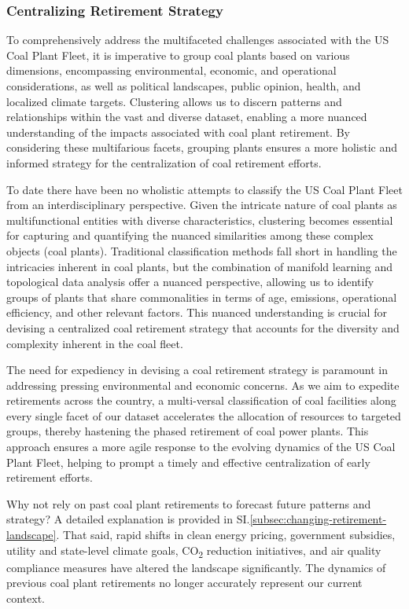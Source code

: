 \subsubsection*{Centralizing Retirement Strategy}


To comprehensively address the multifaceted challenges associated with the US Coal Plant Fleet, it is imperative to group coal plants based on various dimensions, 
encompassing environmental, economic, and operational considerations, as well as political landscapes, public opinion, health, and localized climate targets. Clustering allows us to discern patterns and relationships within the vast and diverse dataset, 
enabling a more nuanced understanding of the impacts associated with coal plant retirement. By considering these multifarious facets, grouping plants ensures a more 
holistic and informed strategy for the centralization of coal retirement efforts.

To date there have been no wholistic attempts to classify the US Coal Plant Fleet from an interdisciplinary perspective. Given the intricate nature of coal 
plants as multifunctional entities with diverse characteristics, clustering becomes essential for capturing and quantifying the nuanced similarities among these 
complex objects (coal plants). Traditional classification methods fall short in handling the intricacies inherent in coal plants, but the combination of manifold learning and topological data analysis offer 
a nuanced perspective, allowing us to identify groups of plants that share commonalities in terms of age, emissions, operational efficiency, and other relevant factors. 
This nuanced understanding is crucial for devising a centralized coal retirement strategy that accounts for the diversity and complexity inherent in the coal fleet.

The need for expediency in devising a coal retirement strategy is paramount in addressing pressing environmental and economic concerns. As we aim to expedite retirements across the country, 
a multi-versal classification of coal facilities along every single facet of our dataset accelerates the allocation of resources to targeted groups, thereby hastening the phased retirement of 
coal power plants. This approach ensures a more agile response to the evolving dynamics of the US Coal Plant Fleet, helping to prompt a timely and effective centralization of early retirement efforts.

Why not rely on past coal plant retirements to forecast future patterns and strategy? A detailed explanation is provided in SI.\ref{subsec:changing-retirement-landscape}. 
That said, rapid shifts in clean energy pricing, government subsidies, utility and state-level climate goals, CO\textsubscript{2} reduction initiatives, and air quality 
compliance measures have altered the landscape significantly. The dynamics of previous coal plant retirements no longer accurately represent our current context.

